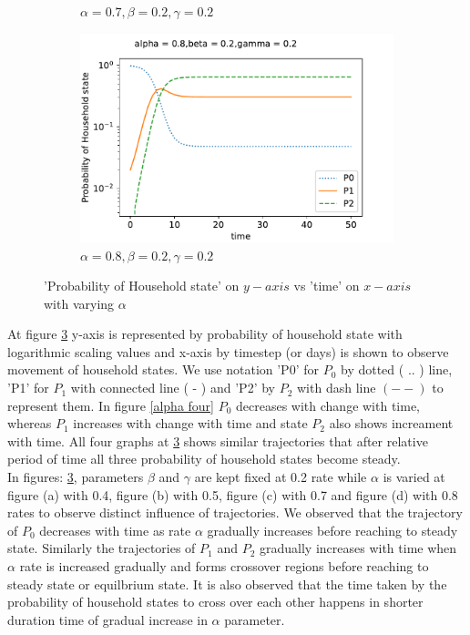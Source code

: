 \documentclass[paper=a4, fontsize=11pt, twoside, BCOR=12mm, parskip=full, listof=totoc]{scrreprt}
\begin{document}
{\begin{figure}[H]
\begin{subfigure}[b]{0.4\linewidth}
	    \caption{\(\alpha=0.7, \beta=0.2, \gamma=0.2\)}
	    \label{alpha seven}
	\end{subfigure}
	\begin{subfigure}[b]{0.4\linewidth}
	    \includegraphics[width=\linewidth]{sim/041_g5.pdf}
	    \caption{\(\alpha=0.8, \beta=0.2, \gamma=0.2\)}
	    \label{alpha eight}
	\end{subfigure}
	\caption{'Probability of Household state' on $y-axis$ vs 'time' on $x-axis$ with varying $\alpha$}
	\label{fig Probabilities of Household state varying alpha}
\end{figure}


At figure \ref{fig Probabilities of Household state varying alpha} y-axis is represented by probability of household state with logarithmic scaling values and x-axis by timestep (or days) is shown to observe movement of household states. We use notation 'P0' for $P_0$ by dotted ( .. ) line, 'P1' for $P_1$ with connected line ( - ) and 'P2' by $P_2$ with dash line \( (--) \) to represent them. In figure \ref{alpha four} $ P_0 $ decreases with change with time, whereas $P_1$ increases with change with time and state $P_2$ also shows increament with time. All four graphs at \ref{fig Probabilities of Household state varying alpha} shows similar trajectories that after relative period of time all three probability of household states become steady.\\
   
In figures: \ref{fig Probabilities of Household state varying alpha}, parameters $\beta$ and $\gamma$ are kept fixed at 0.2 rate while $\alpha$ is varied at figure (a) with 0.4, figure (b) with 0.5, figure (c) with 0.7 and figure (d) with 0.8 rates to observe distinct influence of trajectories. We observed that the trajectory of $P_0$ decreases with time as rate $\alpha$ gradually increases before reaching to steady state. Similarly the trajectories of $P_1$ and $P_2$ gradually increases with time when $\alpha$ rate is increased gradually and forms crossover regions before reaching to steady state or equilbrium state. 
It is also observed that the time taken by the probability of household states to cross over each other happens in shorter duration time of gradual increase in $\alpha$ parameter.\\   
             
}
\end{document}
